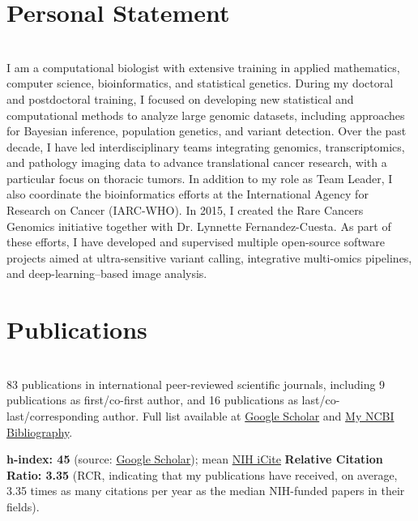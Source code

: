 \documentclass[10pt,a4paper]{article}
\begin{document}
\section{Personal Statement}
\ \\
I am a computational biologist with extensive training in applied mathematics, computer science,
bioinformatics, and statistical genetics. During my doctoral and postdoctoral training, I focused on
developing new statistical and computational methods to analyze large genomic datasets, including
approaches for Bayesian inference, population genetics, and variant detection. Over the past decade, I
have led interdisciplinary teams integrating genomics, transcriptomics, and pathology imaging data to
advance translational cancer research, with a particular focus on thoracic tumors. In addition to my role as Team Leader, I also coordinate the
bioinformatics efforts at the International Agency for Research on Cancer (IARC-WHO). In 2015, I created the Rare Cancers Genomics initiative
together with Dr. Lynnette Fernandez-Cuesta. As part of these efforts, I have developed and supervised
multiple open-source software projects aimed at ultra-sensitive variant calling, integrative multi-omics
pipelines, and deep-learning–based image analysis.

\section{Publications}
\ \\
83 publications in international peer-reviewed scientific journals, including 9 publications as first/co-first author, and 16 publications as last/co-last/corresponding author. Full list available at \href{https://scholar.google.com/citations?hl=en&user=vzZPQj8AAAAJ&view_op=list_works&sortby=pubdate}{Google Scholar} and  \href{https://www.ncbi.nlm.nih.gov/myncbi/matthieu.foll.1/bibliography/public/}{My NCBI Bibliography}.

\textbf{h-index: 45} (source: \href{https://scholar.google.com/citations?hl=en&user=vzZPQj8AAAAJ&view_op=list_works&sortby=pubdate}{Google Scholar}); mean \href{https://icite.od.nih.gov/results?search_id=s2kwpwnywv4qgg4r#}{NIH iCite} \textbf{Relative Citation Ratio: 3.35} (RCR, indicating that my publications have received, on average, 3.35 times as many citations per year as the median NIH-funded papers in their fields).
\end{document}
